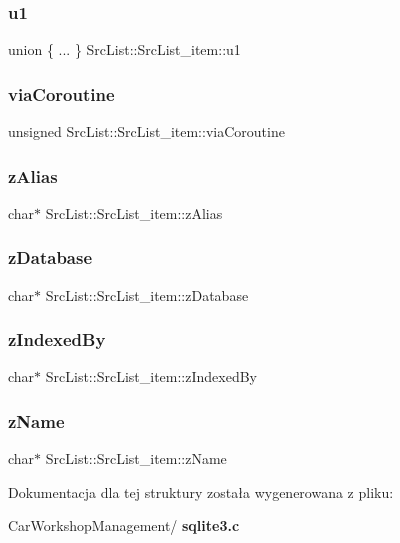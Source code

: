 \subsubsection{u1}
{\footnotesize\ttfamily union \{ ... \}   Src\+List\+::\+Src\+List\+\_\+item\+::u1}

\mbox{\label{struct_src_list_1_1_src_list__item_abf6f9d1f615f44c6f3e2dde9f57d77f0}} 
\subsubsection{viaCoroutine}
{\footnotesize\ttfamily unsigned Src\+List\+::\+Src\+List\+\_\+item\+::via\+Coroutine}

\mbox{\label{struct_src_list_1_1_src_list__item_a461ef8d80828ed8dd4409b9244ae2919}} 
\subsubsection{zAlias}
{\footnotesize\ttfamily char$\ast$ Src\+List\+::\+Src\+List\+\_\+item\+::z\+Alias}

\mbox{\label{struct_src_list_1_1_src_list__item_a2f7bf0921794dc46d74d2546fc10f7de}} 
\subsubsection{zDatabase}
{\footnotesize\ttfamily char$\ast$ Src\+List\+::\+Src\+List\+\_\+item\+::z\+Database}

\mbox{\label{struct_src_list_1_1_src_list__item_a7ff3bdf06f619c81673138050aa50077}} 
\subsubsection{zIndexedBy}
{\footnotesize\ttfamily char$\ast$ Src\+List\+::\+Src\+List\+\_\+item\+::z\+Indexed\+By}

\mbox{\label{struct_src_list_1_1_src_list__item_afee5c5a84594fed8100be3cdb3e3ff1c}} 
\subsubsection{zName}
{\footnotesize\ttfamily char$\ast$ Src\+List\+::\+Src\+List\+\_\+item\+::z\+Name}



Dokumentacja dla tej struktury została wygenerowana z pliku\+:\begin{DoxyCompactItemize}
\item 
Car\+Workshop\+Management/\textbf{ sqlite3.\+c}\end{DoxyCompactItemize}
